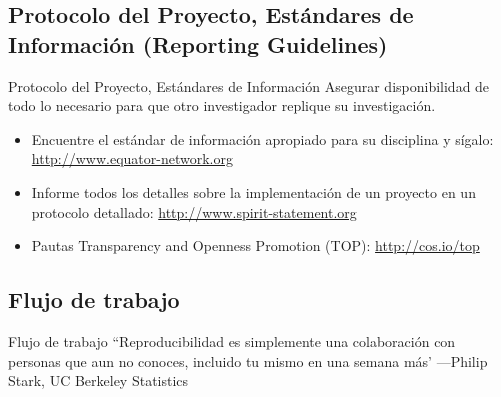 \documentclass{beamer}
\begin{document}
\subsection*{Protocolo del Proyecto, Estándares de Información (Reporting Guidelines)}
\begin{frame}[<.->]{Protocolo del Proyecto, Estándares de Información}
Asegurar disponibilidad de todo lo necesario para que otro investigador replique su investigación.
 \begin{itemize}
 \item Encuentre el estándar de información apropiado para su disciplina y sígalo: \url{http://www.equator-network.org}
\item Informe todos los detalles sobre la implementación de un proyecto en un protocolo detallado: \url{http://www.spirit-statement.org}
\item Pautas Transparency and Openness Promotion (TOP): \url{http://cos.io/top}
\end{itemize}
\end{frame}

 { %
    \begin{frame}[plain, label=AEAreg]
     \end{frame}
}

 \subsection*{Flujo de trabajo}
 \begin{frame}{Flujo de trabajo}
``Reproducibilidad es simplemente una colaboración con personas que aun no conoces, incluido tu mismo en una semana más'
---Philip Stark, UC Berkeley Statistics
\end{frame}
\end{document}

